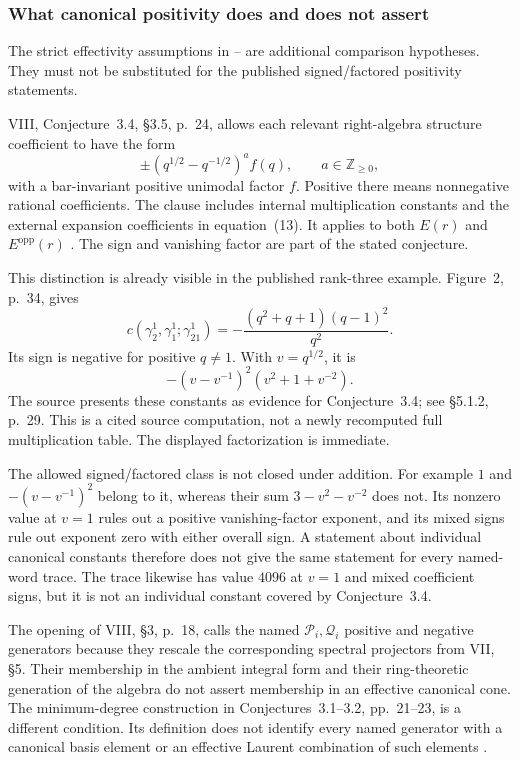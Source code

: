 \subsubsection{What canonical positivity does and does not assert}

The strict effectivity assumptions in --
are additional comparison hypotheses.
They must not be substituted for the published
signed/factored positivity statements.

VIII, Conjecture~3.4, \S3.5, p.~24, allows each relevant
right-algebra structure coefficient to have the form
\[
       \pm(q^{1/2}-q^{-1/2})^a f(q),
       \qquad a\in\mathbb Z_{\ge0},
\]
with a bar-invariant positive unimodal factor \(f\).
Positive there means nonnegative rational coefficients.
The clause includes internal multiplication constants
and the external expansion coefficients in equation~(13).
It applies to both \(E(r)\) and \(E^{\mathrm{opp}}(r)\)
\cite{VIII}.
The sign and vanishing factor are part of the stated
conjecture.

This distinction is already visible in the published
rank-three example. Figure~2, p.~34, gives
\begin{equation}\label{eq:publishedsignedcanonicalconstant}
 c(\gamma_2^1,\gamma_1^1;\gamma_{21}^1)
       =-\frac{(q^2+q+1)(q-1)^2}{q^2}.
\end{equation}
Its sign is negative for positive \(q\ne1\).
With \(v=q^{1/2}\), it is
\[
              -(v-v^{-1})^2(v^2+1+v^{-2}).
\]
The source presents these constants as evidence for
Conjecture~3.4; see \S5.1.2, p.~29.
This is a cited source computation, not a newly
recomputed full multiplication table.
The displayed factorization is immediate.

The allowed signed/factored class is not closed under
addition. For example \(1\) and \(-(v-v^{-1})^2\)
belong to it, whereas their sum
\(3-v^2-v^{-2}\) does not.
Its nonzero value at \(v=1\) rules out a positive
vanishing-factor exponent, and its mixed signs rule
out exponent zero with either overall sign.
A statement about individual canonical constants
therefore does not give the same statement for every
named-word trace. The  trace likewise has
value \(4096\) at \(v=1\) and mixed coefficient signs,
but it is not an individual constant covered by
Conjecture~3.4.

The opening of VIII, \S3, p.~18, calls the named
\(\mathcal P_i,\mathcal Q_i\) positive and negative
generators because they rescale the corresponding
spectral projectors from VII, \S5.
Their membership in the ambient integral form and their
ring-theoretic generation of the algebra do not assert
membership in an effective canonical cone.
The minimum-degree construction in Conjectures~3.1--3.2,
pp.~21--23, is a different condition.
Its definition does not identify every named generator
with a canonical basis element or an effective Laurent
combination of such elements \cite{VII,VIII}.

